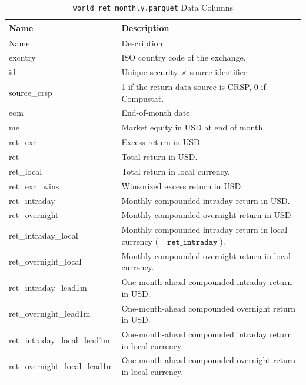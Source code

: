 \documentclass[12pt,title,fleqn]{article}
\begin{document}
{\scriptsize
\begin{longtable}{@{\extracolsep{\fill}}|l|m{14.2cm}|@{}}
\caption{\texttt{world\_ret\_monthly.parquet} Data Columns \label{world-ret-monthly-cols}}\\
\hline
Name & Description \\
\hline
\endfirsthead
\hline
Name & Description \\
\hline
\endhead
\hline
\endfoot
\hline\hline
\endlastfoot

excntry\rule{0pt}{10pt} & ISO country code of the exchange. \\[1ex]
id & Unique security $\times$ source identifier. \\[1ex]
source\_crsp & 1 if the return data source is CRSP, 0 if Compustat. \\[1ex]
eom & End-of-month date. \\[1ex]
me & Market equity in USD at end of month. \\[1ex]
ret\_exc & Excess return in USD. \\[1ex]
ret & Total return in USD. \\[1ex]
ret\_local & Total return in local currency. \\[1ex]
ret\_exc\_wins & Winsorized excess return in USD. \\[1ex]
ret\_intraday & Monthly compounded intraday return in USD. \\[1ex]
ret\_overnight & Monthly compounded overnight return in USD. \\[1ex]
ret\_intraday\_local & Monthly compounded intraday return in local currency ($=\texttt{ret\_intraday}$). \\[1ex]
ret\_overnight\_local & Monthly compounded overnight return in local currency. \\[1ex]
ret\_intraday\_lead1m & One-month-ahead compounded intraday return in USD. \\[1ex]
ret\_overnight\_lead1m & One-month-ahead compounded overnight return in USD. \\[1ex]
ret\_intraday\_local\_lead1m & One-month-ahead compounded intraday return in local currency. \\[1ex]
ret\_overnight\_local\_lead1m & One-month-ahead compounded overnight return in local currency. \\[1ex]

\end{longtable}}

\end{document}
